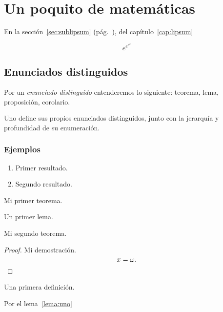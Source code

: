 \chapter{Un poquito de matemáticas}

En la sección~\ref{sec:sublipsum} (pág.~\pageref{sec:sublipsum}), del capítulo~\ref{cap:lipsum}

\begin{equation*}
  e^{e^{e^e}}
\end{equation*}

\section{Enunciados distinguidos}

Por un \emph{enunciado distinguido} entenderemos lo siguiente: teorema, lema, proposición, corolario.

Uno define sus propios enunciados distinguidos, junto con la jerarquía y profundidad de su enumeración.

\subsection{Ejemplos}

\begin{teo}
  \leavevmode
  \begin{enumerate}
    \item Primer resultado.
    \item Segundo resultado.
  \end{enumerate}
Mi primer teorema.
\end{teo}

\begin{lema}\label{lema:uno}
Un primer lema.
\end{lema}

\begin{teo}[Cauchy]
  Mi segundo teorema.
  \end{teo}
\begin{proof}
  Mi demostración.
  \begin{equation*}
    x=\omega.\qedhere
  \end{equation*}
\end{proof}

\begin{defi}
  Una primera definición.
\end{defi}

\begin{obs}
Por el lema~\ref{lema:uno} 
\end{obs}

